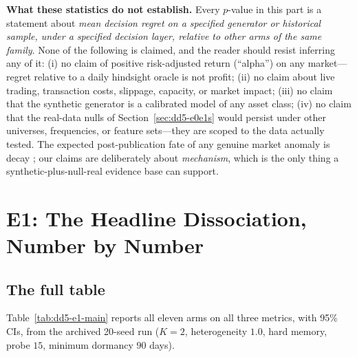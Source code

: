 \documentclass[11pt,a4paper]{article}
\theoremstyle{definition}
\theoremstyle{plain}
\begin{document}
\begin{warning}
\textbf{What these statistics do not establish.} Every $p$-value in this
part is a statement about \emph{mean decision regret on a specified
generator or historical sample, under a specified decision layer, relative
to other arms of the same family}. None of the following is claimed, and the
reader should resist inferring any of it: (i) no claim of positive risk-adjusted
return (``alpha'') on any market---regret relative to a daily hindsight
oracle is not profit; (ii) no claim about live trading, transaction costs,
slippage, capacity, or market impact; (iii) no claim that the synthetic
generator is a calibrated model of any asset class; (iv) no claim that the
real-data nulls of Section~\ref{sec:dd5-e0e1s} would persist under other
universes, frequencies, or feature sets---they are scoped to the data
actually tested. The expected post-publication fate of any genuine
market anomaly is decay \citep{mclean2016does}; our claims are deliberately
about \emph{mechanism}, which is the only thing a synthetic-plus-null-real
evidence base can support.
\end{warning}

\section{E1: The Headline Dissociation, Number by Number}
\label{sec:dd5-e1}

\subsection{The full table}
\label{sec:dd5-e1-table}

Table~\ref{tab:dd5-e1-main} reports all eleven arms on all three metrics,
with 95\% CIs, from the archived 20-seed run ($K=2$, heterogeneity $1.0$,
hard memory, probe $15$, minimum dormancy $90$ days).
\end{document}
